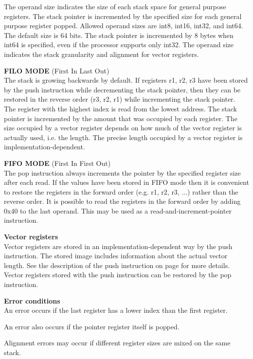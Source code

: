 \documentclass[forwardcom.tex]{subfiles}
\begin{document}
The operand size indicates the size of each stack space for general purpose registers. The stack pointer is incremented by the specified size for each general purpose register popped. Allowed operand sizes are int8, int16, int32, and int64. The default size is 64 bits. The stack pointer is incremented by 8 bytes when int64 is specified, even if the processor supports only int32. The operand size indicates the stack granularity and alignment for vector registers.
\vv

\textbf{FILO MODE} (First In Last Out) \\
The stack is growing backwards by default. If registers r1, r2, r3 have been stored by the push instruction while decrementing the stack pointer, then they can be restored in the reverse order (r3, r2, r1) while incrementing the stack pointer. The  register with the highest index is read from the lowest address. The stack pointer is incremented by the amount that was occupied by each register. The size occupied by a vector register depends on how much of the vector register is actually used, i.e. the length. The precise length occupied by a vector register is implementation-dependent.
\vv

\textbf{FIFO MODE} (First In First Out) \\
The pop instruction always increments the pointer by the specified register size after each read. If the values have been stored in FIFO mode then it is convenient to restore the registers in the forward order (e.g. r1, r2, r3, ...) rather than the reverse order. 
It is possible to read the registers in the forward order by adding 0x40 to the last operand. This may be used as a read-and-increment-pointer instruction.
\vv

\textbf{Vector registers}\\
Vector registers are stored in an implementation-dependent way by the push instruction. The stored image includes information about the actual vector length. 
See the description of the push instruction on page \pageref{table:pushInstruction} for more details. Vector registers stored with the push instruction can be restored by the pop instruction.
\vv


\textbf{Error conditions}\\
An error occurs if the last register has a lower index than the first register.
\vv

An error also occurs if the pointer register itself is popped.
\vv

Alignment errors may occur if different register sizes are mixed on the same stack.
\vv
\end{document}
